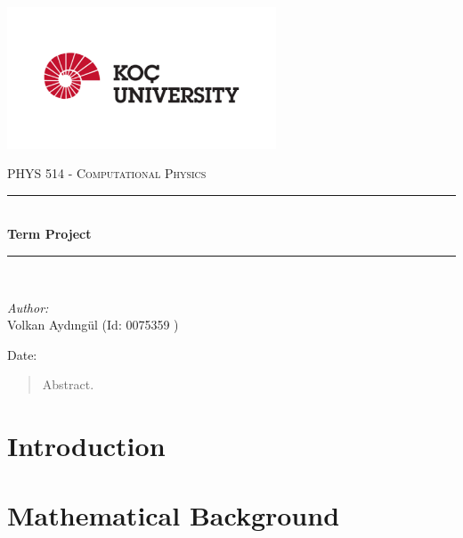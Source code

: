 \documentclass[letterpaper,12pt]{article}
\newcommand{\reporttitle}{Term Project}
\newcommand{\reportauthor}{ Volkan Aydıngül (Id: 0075359 )\\
                            }
\begin{document}
\begin{titlepage}
\newcommand{\HRule}{\rule{0.7\linewidth}{0.5mm}}
\begin{center} %
\includegraphics[width = 8cm]{figures/koc_logo.png}

\textsc{\Large PHYS 514 - Computational Physics}\\[1.5cm] 
\HRule \\[0.6cm]
{ \huge \bfseries \reporttitle}\\ %
\HRule \\[1.5cm]
\end{center}
\vspace{2cm}
\begin{flushleft} \large
\textit{Author:}\\
\reportauthor%
\end{flushleft}
\vspace{2cm}
\makeatletter
Date: \@date 
\vfill %
\makeatother
\end{titlepage}




\tableofcontents
\newpage







\begin{abstract}
    Abstract.
\end{abstract}
\section{Introduction}


\section{Mathematical Background}
\end{document}
